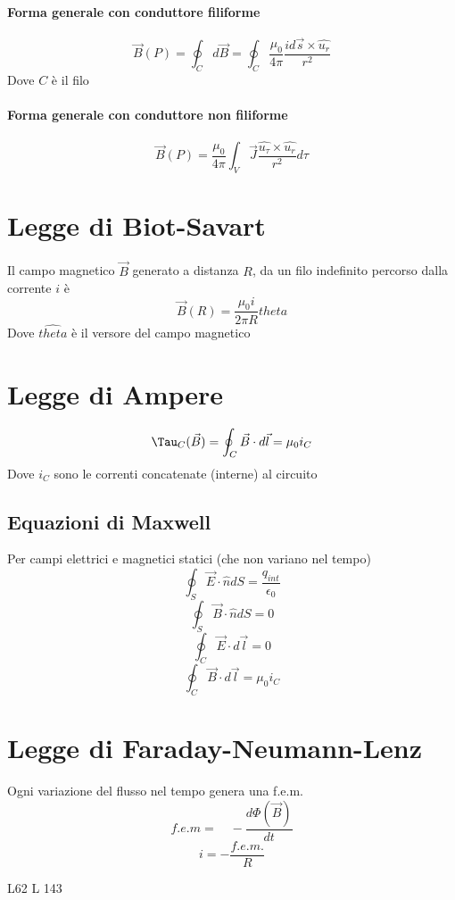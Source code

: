 \documentclass[a4paper]{report}
\begin{document}
  \paragraph{Forma generale con conduttore filiforme}
  \[ \vec{B}(P) = \oint_C d\vec{B} = \oint_C \frac{\mu_0}{4\pi} \frac{id\vec{s} \times \hat{u_r}}{r^2}\]
  Dove $C$ è il filo
  \paragraph{Forma generale con conduttore non filiforme}
  \[ \vec{B}(P) = \frac{\mu_0}{4\pi} \int_V \vec{J}\frac{\hat{u_\tau} \times \hat{u_r}}{r^2} d\tau \]

  \section{Legge di Biot-Savart}
  Il campo magnetico $\vec{B}$ generato a distanza $R$, da un filo indefinito percorso dalla corrente $i$ è
  \[ \vec{B}(R) = \frac{\mu_0 i}{2 \pi R} \hat{theta} \]
  Dove $\hat{theta}$ è il versore del campo magnetico

  \section{Legge di Ampere}
  \[ \Tau_C (\vec{B}) = \oint_C \vec{B} \cdot d\vec{l} = \mu_0 i_C \]
  Dove $i_C$ sono le correnti concatenate (interne) al circuito

  \subsection{Equazioni di Maxwell}
  Per campi elettrici e magnetici statici (che non variano nel tempo)
  \[ \oint_S \vec{E}\cdot \hat{n} dS = \frac{q_{int}}{\epsilon_0} \]
  \[ \oint_S \vec{B}\cdot \hat{n} dS = 0 \]
  \[ \oint_C \vec{E}\cdot d\vec{l} = 0 \]
  \[ \oint_C \vec{B} \cdot d\vec{l} = \mu_0 i_C \]

  \section{Legge di Faraday-Neumann-Lenz}
  Ogni variazione del flusso nel tempo genera una f.e.m.
  \[f.e.m = \quad -\frac{d\Phi(\vec{B})}{dt} \]
  \[ i = -\frac{f.e.m.}{R} \]

  L62
L 143
\end{document}
